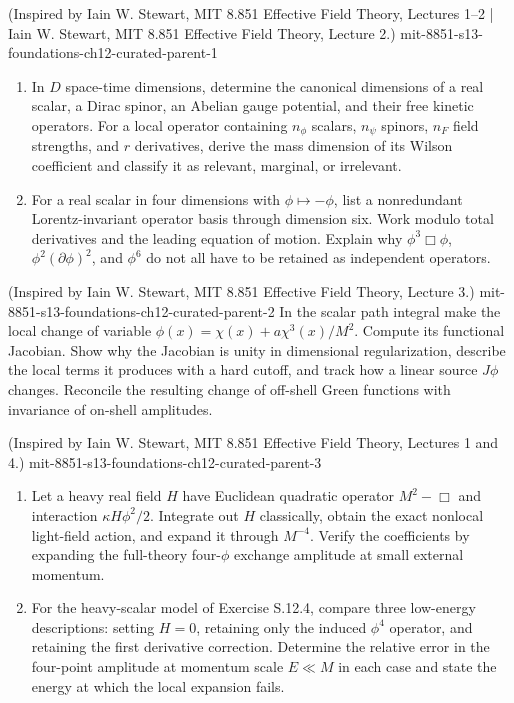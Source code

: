 
\begin{enumerate}
  {(Inspired by Iain W. Stewart, MIT 8.851 Effective Field Theory, Lectures 1--2 | Iain W. Stewart, MIT 8.851 Effective Field Theory, Lecture 2.)}
  {mit-8851-s13-foundations-ch12-curated-parent-1}
\begin{enumerate}
\item
In \(D\) space-time dimensions, determine the canonical dimensions of a
real scalar, a Dirac spinor, an Abelian gauge potential, and their free
kinetic operators.  For a local operator containing \(n_\phi\) scalars,
\(n_\psi\) spinors, \(n_F\) field strengths, and \(r\) derivatives, derive
the mass dimension of its Wilson coefficient and classify it as relevant,
marginal, or irrelevant.
\item
For a real scalar in four dimensions with \(\phi\mapsto-\phi\), list a
nonredundant Lorentz-invariant operator basis through dimension six.  Work
modulo total derivatives and the leading equation of motion.  Explain why
\(\phi^3\Box\phi\), \(\phi^2(\partial\phi)^2\), and \(\phi^6\) do not all
have to be retained as independent operators.
\end{enumerate}

  {(Inspired by Iain W. Stewart, MIT 8.851 Effective Field Theory, Lecture 3.)}
  {mit-8851-s13-foundations-ch12-curated-parent-2}
In the scalar path integral make the local change of variable
\(\phi(x)=\chi(x)+a\chi^3(x)/M^2\).  Compute its functional Jacobian.
Show why the Jacobian is unity in dimensional regularization, describe the
local terms it produces with a hard cutoff, and track how a linear source
\(J\phi\) changes.  Reconcile the resulting change of off-shell Green
functions with invariance of on-shell amplitudes.

  {(Inspired by Iain W. Stewart, MIT 8.851 Effective Field Theory, Lectures 1 and 4.)}
  {mit-8851-s13-foundations-ch12-curated-parent-3}
\begin{enumerate}
\item
Let a heavy real field \(H\) have Euclidean quadratic operator
\(M^2-\Box\) and interaction \(\kappa H\phi^2/2\).  Integrate out \(H\)
classically, obtain the exact nonlocal light-field action, and expand it
through \(M^{-4}\).  Verify the coefficients by expanding the full-theory
four-\(\phi\) exchange amplitude at small external momentum.
\item
For the heavy-scalar model of Exercise S.12.4, compare three low-energy
descriptions: setting \(H=0\), retaining only the induced \(\phi^4\)
operator, and retaining the first derivative correction.  Determine the
relative error in the four-point amplitude at momentum scale \(E\ll M\)
in each case and state the energy at which the local expansion fails.
\end{enumerate}


\end{enumerate}
